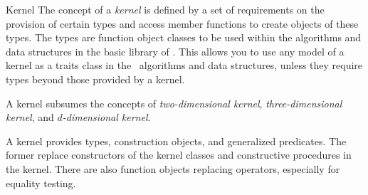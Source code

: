 \begin{ccRefConcept}{Kernel}
The concept of a {\em kernel} is defined by a set of requirements on
the provision of certain types and access member functions to create 
objects of these types. The types are function object classes to be used
within the algorithms and data structures in the basic library of \cgal. 
This allows you to use any model of a kernel as a traits class in 
the \cgal\ algorithms and data structures, unless they require types 
beyond those provided by a kernel. 

A kernel subsumes the concepts of {\em two-dimensional kernel},
{\em three-dimensional kernel}, and {\em $d$-dimensional kernel}.

A kernel provides types, construction objects, and generalized predicates. 
The former replace constructors of the kernel classes and constructive procedures
in the kernel. There are also function objects replacing operators, especially
for equality testing.


\ccTypes

\ccGlue
{}



\ccGlue
{}
\ccGlue
{}
\ccGlue
{}
\ccGlue
{}
\ccGlue
{}
\ccGlue
{}
\ccGlue
{}
\ccGlue
{}
\ccGlue
{}



\end{ccRefConcept}
